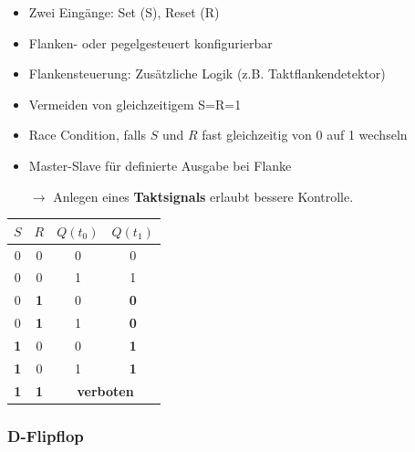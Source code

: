 \documentclass[a4paper,6pt]{article}
\begin{document}
\begin{multicols*}{3}
\begin{itemize}
    \item Zwei Eingänge: Set (S), Reset (R)
    \item Flanken- oder pegelgesteuert konfigurierbar
    \item Flankensteuerung: Zusätzliche Logik (z.B. Taktflankendetektor)
    \item Vermeiden von gleichzeitigem S=R=1
    \item Race Condition, falls $S$ und $R$ fast gleichzeitig von 0 auf 1 wechseln
    \item Master-Slave für definierte Ausgabe bei Flanke
    \item[$\rightarrow$] Anlegen eines \textbf{Taktsignals} erlaubt bessere Kontrolle.
\end{itemize}

\begin{center}
    \begin{tabular}{|c|c||c|c|}
    \hline
    $S$ & $R$ & $Q(t_0)$ & $Q(t_1)$ \\ \hline
    0 & 0 & 0 & 0 \\ \hline
    0 & 0 & 1 & 1 \\ \hline
    0 & \textbf{1} & 0 & \textbf{0} \\ \hline
    0 & \textbf{1} & 1 & \textbf{0} \\ \hline
    \textbf{1} & 0 & 0 & \textbf{1} \\ \hline
    \textbf{1} & 0 & 1 & \textbf{1} \\ \hline
    \textbf{1} & \textbf{1} & \multicolumn{2}{c|}{\textbf{verboten}} \\ \hline
    \end{tabular}
\end{center}

\subsubsection{D-Flipflop}





\end{multicols*}
\end{document}
